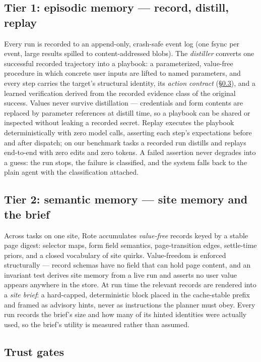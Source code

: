 \documentclass{article} %
\begin{document}
\subsection{Tier 1: episodic memory --- record, distill, replay}
\label{sec:tier1}

Every run is recorded to an append-only, crash-safe event log (one fsync per event, large
results spilled to content-addressed blobs). The \emph{distiller} converts one successful
recorded trajectory into a playbook: a parameterized, value-free procedure in which
concrete user inputs are lifted to named parameters, and every step carries the target's
structural identity, its \emph{action contract} (\S\ref{sec:gates}), and a learned
verification derived from the recorded evidence class of the original success. Values
never survive distillation --- credentials and form contents are replaced by parameter
references at distill time, so a playbook can be shared or inspected without leaking a
recorded secret. Replay executes the playbook deterministically with zero model calls,
asserting each step's expectations before and after dispatch; on our benchmark tasks a
recorded run distills and replays end-to-end with zero edits and zero tokens. A failed
assertion never degrades into a guess: the run stops, the failure is classified, and the
system falls back to the plain agent with the classification attached.

\subsection{Tier 2: semantic memory --- site memory and the brief}
\label{sec:tier2}

Across tasks on one site, Rote accumulates \emph{value-free} records keyed by a stable
page digest: selector maps, form field semantics, page-transition edges, settle-time
priors, and a closed vocabulary of site quirks. Value-freedom is enforced structurally
--- record schemas have no field that can hold page content, and an invariant test
derives site memory from a live run and asserts no user value appears anywhere in the
store. At run time the relevant records are rendered into a \emph{site brief}: a
hard-capped, deterministic block placed in the cache-stable prefix and framed as
advisory hints, never as instructions the planner must obey. Every run records the
brief's size and how many of its hinted identities were actually used, so the brief's
utility is measured rather than assumed.

\subsection{Trust gates}
\label{sec:gates}
\end{document}
